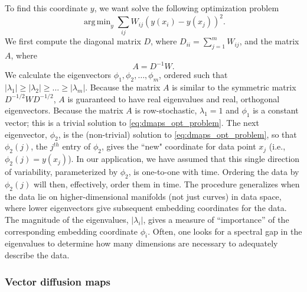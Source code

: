 \documentclass{pnastwo}
\DeclareMathOperator*{\argmin}{arg\,min}
\begin{document}
\begin{article}
To find this coordinate $y$, we want solve the following optimization problem \cite{Belkin2003}
\begin{equation} \label{eq:dmaps_opt_problem}
\argmin_{y} \sum_{ij} W_{ij} (y(x_i) - y(x_j))^2.
\end{equation}
%
We first compute the diagonal matrix $D$, where $D_{ii} = \sum_{j=1}^{m} W_{ij}$, and the matrix $A$, where
\begin{equation} \label{eq:dmaps_A}
A = D^{-1} W.
\end{equation}
%
We calculate the eigenvectors $\phi_1, \phi_2, \dots, \phi_m$, ordered such that $|\lambda_1| \ge |\lambda_2| \ge \dots \ge |\lambda_m|$.
%
Because the matrix $A$ is similar to the symmetric matrix $D^{-1/2} W D^{-1/2}$, $A$ is guaranteed to have real eigenvalues and real, orthogonal eigenvectors.
%
Because the matrix $A$ is row-stochastic, $\lambda_1=1$ and $\phi_1$ is a constant vector; this is a trivial solution to \eqref{eq:dmaps_opt_problem}.
%
%
The next eigenvector, $\phi_2$, is the (non-trivial) solution to \eqref{eq:dmaps_opt_problem}, so that $\phi_2(j)$, the $j^{th}$ entry of $\phi_2$, gives the ``new" coordinate for data point $x_j$ (i.e., $\phi_2(j) = y(x_j)$).
%
In our application, we have assumed that this single direction of variability, parameterized by $\phi_2$, is one-to-one with time.
%
Ordering the data by $\phi_2(j)$ will then, effectively, order them in time.
%
The procedure generalizes when the data lie on higher-dimensional manifolds (not just curves) in data space, where lower eigenvectors give subsequent embedding coordinates for the data.
%
The magnitude of the eigenvalues, $|\lambda_i|$, gives a measure of ``importance'' of the corresponding embedding coordinate $\phi_i$.
%
Often, one looks for a spectral gap in the eigenvalues to determine how many dimensions are necessary to adequately describe the data. 

\subsubsection{Vector diffusion maps\cite{singer2012vector}}


\end{article}
\end{document}
